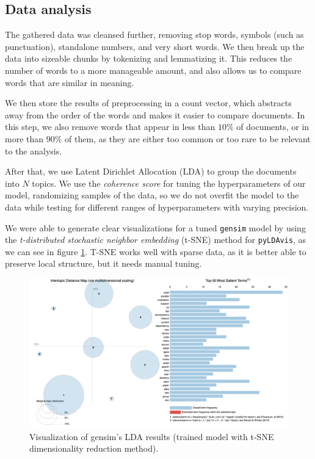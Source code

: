 \documentclass[12pt]{article}
\begin{document}
\subsection{Data analysis} \label{sec:methodology:data-analysis}

The gathered data was cleansed further, removing stop words, symbols (such as
punctuation), standalone numbers, and very short words.
We then break up the data into sizeable chunks by tokenizing and lemmatizing
it.
This reduces the number of words to a more manageable amount, and also allows
us to compare words that are similar in meaning.

We then store the results of preprocessing in a count vector, which abstracts
away from the order of the words and makes it easier to compare documents.
In this step, we also remove words that appear in less than $10\%$ of
documents, or in more than $90\%$ of them, as they are either too common or too
rare to be relevant to the analysis.

After that, we use Latent Dirichlet Allocation (LDA) to group the documents
into $N$ topics.
We use the \textit{coherence score} for tuning the hyperparameters of our
model, randomizing samples of the data, so we do not overfit the model to the
data while testing for different ranges of hyperparameters with varying
precision.

We were able to generate clear visualizations for a tuned \verb|gensim| model
by using the \textit{t-distributed stochastic neighbor embedding} (t-SNE)
method for \verb|pyLDAvis|, as we can see in figure \ref{fig:lda_gensim_tsne}.
T-SNE works well with sparse data, as it is better able to preserve local
structure, but it needs manual tuning.

\begin{figure}[ht]
    \centering
    \includegraphics[width=\linewidth]{gensim-tsne.png}
    \caption{Visualization of gensim's LDA results (trained model with t-SNE
        dimensionality reduction method).}
    \label{fig:lda_gensim_tsne}
\end{figure}
\end{document}
